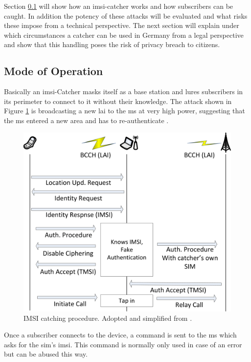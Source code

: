 Section \ref{sec:catcher_operation} will show how an \gls{imsi}-catcher works and how subscribers can be caught.
In addition the potency of these attacks will be evaluated and what risks these impose from a technical perspective.
The next section will explain under which circumstances a catcher can be used in Germany from a legal perspective and show that this handling poses the risk of privacy breach to citizens.

\subsection{Mode of Operation}
\label{sec:catcher_operation}
Basically an \gls{imsi}-Catcher masks itself as a base station and lures subscribers in its perimeter to connect to it without their knowledge.
The attack shown in Figure \ref{fig:catcher_catch} is broadcasting a new \gls{lai} to the \gls{ms} at very high power, suggesting that the \gls{ms} entered a new area and has to re-authenticate \cite{mueller}.

\begin{figure}
	\centering
	\includegraphics{../Images/catcher_attack}
	\caption{IMSI catching procedure. Adopted and simplified from \cite{mueller}.}
	\label{fig:catcher_catch}
\end{figure}

Once a subscriber connects to the device, a command is sent to the \gls{ms} which asks for the \gls{sim}'s \gls{imsi}.
This command is normally only used in case of an error \cite{fox} but can be abused this way.

